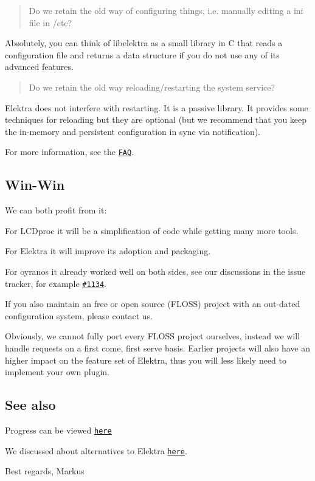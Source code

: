 \begin{quote}
Do we retain the old way of configuring things, i.\+e. manually editing a ini file in /etc? \end{quote}


Absolutely, you can think of libelektra as a small library in C that reads a configuration file and returns a data structure if you do not use any of its advanced features.

\begin{quote}
Do we retain the old way reloading/restarting the system service? \end{quote}


Elektra does not interfere with restarting. It is a passive library. It provides some techniques for reloading but they are optional (but we recommend that you keep the in-\/memory and persistent configuration in sync via notification).

For more information, see the \href{https://www.libelektra.org/manpages/elektra-faq}{\tt F\+AQ}.

\subsection*{Win-\/\+Win}

We can both profit from it\+:


\begin{DoxyEnumerate}
\item For L\+C\+Dproc it will be a simplification of code while getting many more tools.
\item For Elektra it will improve its adoption and packaging.
\end{DoxyEnumerate}

For oyranos it already worked well on both sides, see our discussions in the issue tracker, for example \href{https://issues.libelektra.org/1134}{\tt \#1134}.

If you also maintain an free or open source (F\+L\+O\+SS) project with an out-\/dated configuration system, please contact us.

Obviously, we cannot fully port every F\+L\+O\+SS project ourselves, instead we will handle requests on a first come, first serve basis. Earlier projects will also have an higher impact on the feature set of Elektra, thus you will less likely need to implement your own plugin.

\subsection*{See also}


\begin{DoxyItemize}
\item Progress can be viewed \href{https://git.libelektra.org/projects/7}{\tt here}
\item We discussed about alternatives to Elektra \href{https://issues.libelektra.org/1266}{\tt here}.
\end{DoxyItemize}

Best regards, Markus 